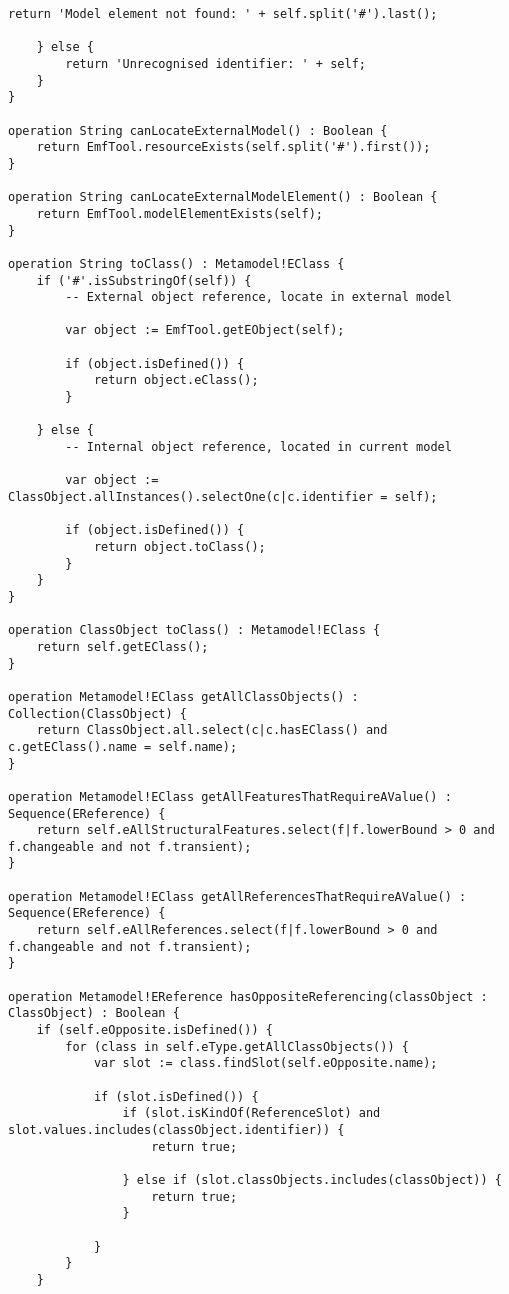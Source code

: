 \begin{lstlisting}[caption=Syntactic and Conformance Constraints in EVL., label=lst:constraints_full, language=EVL]
		return 'Model element not found: ' + self.split('#').last();
	
	} else {
		return 'Unrecognised identifier: ' + self;
	}
}

operation String canLocateExternalModel() : Boolean {
	return EmfTool.resourceExists(self.split('#').first());
}

operation String canLocateExternalModelElement() : Boolean {
	return EmfTool.modelElementExists(self);
}

operation String toClass() : Metamodel!EClass {
	if ('#'.isSubstringOf(self)) {
		-- External object reference, locate in external model

		var object := EmfTool.getEObject(self);
		
		if (object.isDefined()) {
			return object.eClass();
		}
	
	} else {
		-- Internal object reference, located in current model

		var object := ClassObject.allInstances().selectOne(c|c.identifier = self);
	
		if (object.isDefined()) {
			return object.toClass();
		}
	}
}

operation ClassObject toClass() : Metamodel!EClass {
	return self.getEClass();
} 

operation Metamodel!EClass getAllClassObjects() : Collection(ClassObject) {
	return ClassObject.all.select(c|c.hasEClass() and c.getEClass().name = self.name);
}

operation Metamodel!EClass getAllFeaturesThatRequireAValue() : Sequence(EReference) {
	return self.eAllStructuralFeatures.select(f|f.lowerBound > 0 and f.changeable and not f.transient);
}

operation Metamodel!EClass getAllReferencesThatRequireAValue() : Sequence(EReference) {
	return self.eAllReferences.select(f|f.lowerBound > 0 and f.changeable and not f.transient);
}

operation Metamodel!EReference hasOppositeReferencing(classObject : ClassObject) : Boolean {
	if (self.eOpposite.isDefined()) {
		for (class in self.eType.getAllClassObjects()) {
			var slot := class.findSlot(self.eOpposite.name);
			
			if (slot.isDefined()) {
				if (slot.isKindOf(ReferenceSlot) and slot.values.includes(classObject.identifier)) {
					return true;
					
				} else if (slot.classObjects.includes(classObject)) {
					return true;
				}
			
			} 
		}
	}
	

\end{lstlisting}
